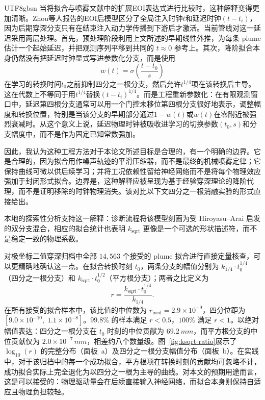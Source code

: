 \documentclass[english, 12pt, a4paper, elec, utf8, a-2b, online]{aaltothesis}
\begin{document}
\begin{CJK*}{UTF8}{gbsn}
当将拟合与喷雾文献中的扩展EOI表达式进行比较时，这种解释变得更加清晰。Zhou等人报告的EOI后模型区分了全局注入时钟\(t\)和延迟时钟\((t-t_i)\)，因为后期穿深分支只有在结束注入动力学传播到下游后才激活\cite{ZhouLiLaiWei2019}。当前管线对这一延迟采用两层处理。首先，预处理阶段利用上文所述的早期线性外推，为每条 plume 估计一个起始延迟，并把观测序列平移到共同的 \(t\approx 0\) 参考上。其次，降阶拟合本身仍然没有把延迟时钟显式写进参数化分支，而是使用
\[
w(t)=\sigma\!\left(\frac{t-t_0}{s}\right)
\]
在学习的转换时间\(t_0\)之前抑制四分之一根分支，然后允许\(t^{1/4}\)项在该转换后主导。这在代数上不等同于用\(t^{1/4}\)替换\((t-t_i)^{1/4}\)。而是工程重新参数化：在有限观测窗口中，延迟第四根分支通常可以用一个门控未移位第四根分支很好地表示，调整幅度和转换位置，特别是当该分支的早期部分通过\(1-w(t)\)或\(w(t)\)在零附近被强烈衰减时。从这个意义上说，延迟物理时钟被吸收进学习的切换参数\((t_0,s)\)和分支幅度中，而不是作为固定已知常数强加。

因此，我认为这种工程方法对于本论文所述目标是合理的，有一个明确的边界。它是合理的，因为拟合用作噪声轨迹的平滑压缩器，而不是最终的机械喷雾定律；它保持曲线可微以供后续学习；并将工况依赖性留给神经网络而不是将每个物理效应强加于封闭形式拟合。边界是，这种解释应被呈现为基于经验穿深理论的降阶代理，而不是证明移除的时钟物理消失。该对比以下文四分之一根消融实验的形式直接给出。

本地的探索性分析支持这一解释：诊断流程将该模型刻画为受 Hiroyasu--Arai 启发的双分支混合，相应的拟合统计也表明 \(k_{\mathrm{sqrt}}\) 更像是一个可选的形状描述符，而不是稳定一致的物理系数。

对极坐标二值穿深归档中全部 \(14{,}563\) 个接受的 plume 拟合进行直接定量核查，可以更精确地确认这一点。在拟合转换时刻 \(t_0\)，两条分支的幅值分别为 \(k_{1/4}\cdot t_0^{1/4}\)（四分之一根分支）和 \(k_{\mathrm{sqrt}}\cdot t_0^{1/2}\)（平方根分支）；两者之比定义为
\[
r = \frac{k_{\mathrm{sqrt}}\cdot t_0^{1/4}}{k_{1/4}}.
\]
在所有接受的拟合样本中，该比值的中位数为 \(r_{\mathrm{med}}=2.9\times10^{-9}\)，四分位距为 \([9.0\times10^{-10},\;1.1\times10^{-8}]\)。\(99.8\%\) 的样本满足 \(r<0.5\)，\(100\%\) 满足 \(r<1\)。以绝对幅值表达：四分之一根分支在 \(t_0\) 时刻的中位贡献为 \(\SI{69.2}{mm}\)，而平方根分支的中位贡献仅为 \(2.0\times10^{-7}\,\si{mm}\)，相差约八个数量级。图~\ref{fig:ksqrt-ratio}展示了 \(\log_{10}(r)\) 的完整分布（面板~a）及四分之一根分支幅值分布（面板~b）。在实践中，对于该归档中的每一个成功拟合，平方根项在转换时刻的贡献均可忽略不计，成功拟合实际上完全退化为以四分之一根为主导的曲线。对本文的预期用途而言，这是可以接受的：物理驱动量会在后续直接输入神经网络，而拟合本身则保持自适应且物理负担较轻。


\end{CJK*}
\end{document}
